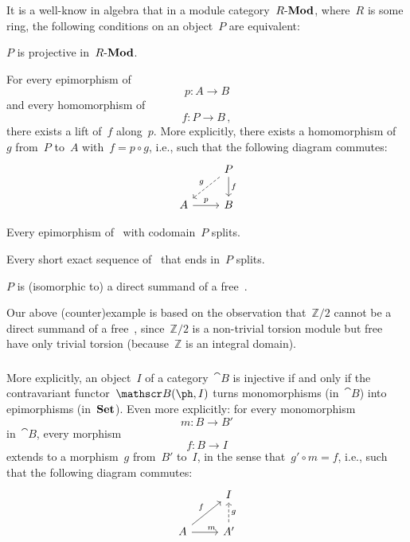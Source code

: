 \begin{remark}
	It is a well-know in algebra that in a module category~$R\text{-}\mathbf{Mod}$, where~$R$ is some ring, the following conditions on an object~$P$ are equivalent:
	\begin{equivalenceslist}

		\item
			$P$ is projective in~$R\text{-}\mathbf{Mod}$.

		\item
			For every epimorphism of~
			\[
				p \colon A \to B
			\]
			and every homomorphism of~
			\[
				f \colon P \to B \,,
			\]
			there exists a lift of~$f$ along~$p$.
			More explicitly, there exists a homomorphism of~~$g$ from~$P$ to~$A$ with~$f = p ∘ g$, i.e., such that the following diagram commutes:
			\[
				\begin{tikzcd}
					{}
					&
					P
					\arrow{d}[right]{f}
					\arrow[dashed]{dl}[above left]{g}
					\\
					A
					\arrow{r}[above]{p}
					&
					B
				\end{tikzcd}
			\]

		\item
			Every epimorphism of~ with codomain~$P$ splits.

		\item
			Every short exact sequence of~ that ends in~$P$ splits.

		\item
			$P$ is (isomorphic to) a direct summand of a free~.

	\end{equivalenceslist}

	Our above (counter)example is based on the observation that~$ℤ / 2$ cannot be a direct summand of a free~, since~$ℤ / 2$ is a non-trivial torsion module but free~ have only trivial torsion (because~$ℤ$ is an integral domain).
\end{remark}



\subsubsection{}

More explicitly, an object~$I$ of a category~$\cat{B}$ is injective if and only if the contravariant functor~$\cat{B}(\ph, I)$ turns monomorphisms (in~$\cat{B}$) into epimorphisms (in~$\mathbf{Set}$).
Even more explicitly:
for every monomorphism
\[
	m \colon B \to B'
\]
in~$\cat{B}$, every morphism
\[
	f \colon B \to I
\]
extends to a morphism~$g$ from~$B'$ to~$I$, in the sense that~$g' ∘ m = f$, i.e., such that the following diagram commutes:
\[
	\begin{tikzcd}
		{}
		&
		I
		\\
		A
		\arrow{ur}[above left]{f}
		\arrow{r}[above right]{m}
		&
		A'
		\arrow[dashed]{u}[right]{g}
	\end{tikzcd}
\]

